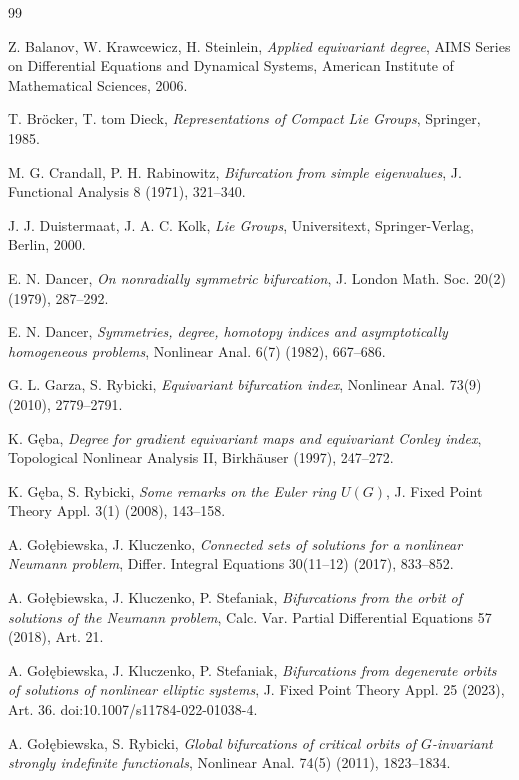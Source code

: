 \documentclass[reqno,twoside,12pt]{amsart}
\numberwithin{equation}{section} \errorcontextlines=0
\begin{document}
\begin{thebibliography}{99}

 Z. Balanov, W. Krawcewicz, H. Steinlein, \emph{Applied equivariant degree}, AIMS Series on Differential Equations and Dynamical Systems, American Institute of Mathematical Sciences, 2006.

 T. Bröcker, T. tom Dieck, \emph{Representations of Compact Lie Groups}, Springer, 1985.

 M. G. Crandall, P. H. Rabinowitz,
\emph{Bifurcation from simple eigenvalues},
J. Functional Analysis 8 (1971), 321--340.

 J. J. Duistermaat, J. A. C. Kolk, \emph{Lie Groups}, Universitext, Springer-Verlag, Berlin, 2000.

 E. N. Dancer, \emph{On nonradially symmetric bifurcation}, J. London Math. Soc. 20(2) (1979), 287--292.

 E. N. Dancer, \emph{Symmetries, degree, homotopy indices and asymptotically homogeneous problems}, Nonlinear Anal. 6(7) (1982), 667--686.

 G. L. Garza, S. Rybicki, \emph{Equivariant bifurcation index}, Nonlinear Anal. 73(9) (2010), 2779--2791.

 K. G\k{e}ba, \emph{Degree for gradient equivariant maps and equivariant Conley index}, Topological Nonlinear Analysis II, Birkhäuser (1997), 247--272.

 K. G\k{e}ba, S. Rybicki, \emph{Some remarks on the Euler ring $U(G)$}, J. Fixed Point Theory Appl. 3(1) (2008), 143--158.

 A. Go{\l}\k{e}biewska, J. Kluczenko, \emph{Connected sets of solutions for a nonlinear Neumann problem}, Differ. Integral Equations 30(11--12) (2017), 833--852.

 A. Go{\l}\k{e}biewska, J. Kluczenko, P. Stefaniak, \emph{Bifurcations from the orbit of solutions of the Neumann problem}, Calc. Var. Partial Differential Equations 57 (2018), Art. 21.

 A. Go{\l}\k{e}biewska, J. Kluczenko, P. Stefaniak, \emph{Bifurcations from degenerate orbits of solutions of nonlinear elliptic systems}, J. Fixed Point Theory Appl. 25 (2023), Art. 36. doi:10.1007/s11784-022-01038-4.

 A. Go{\l}\k{e}biewska, S. Rybicki, \emph{Global bifurcations of critical orbits of $G$-invariant strongly indefinite functionals}, Nonlinear Anal. 74(5) (2011), 1823--1834.


\end{thebibliography}
\end{document}

